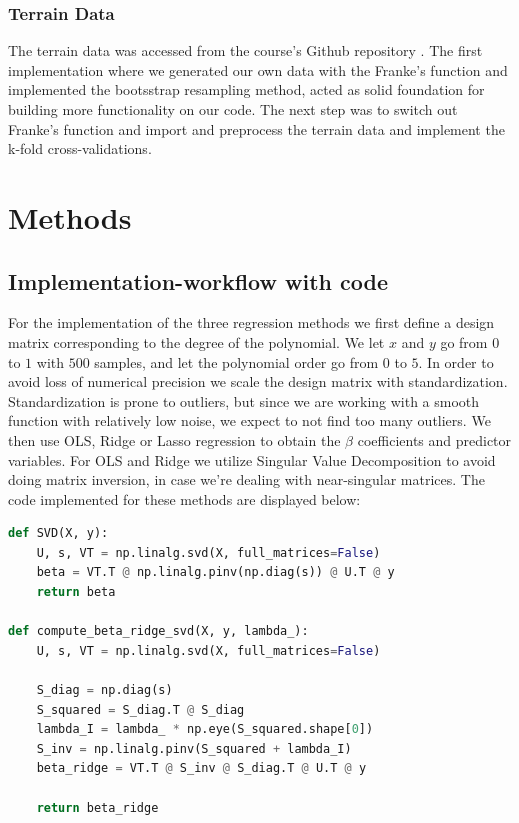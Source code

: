 \documentclass[aps,rmp,reprint,amsmath,amssymb,graphicx,longbibliography]{revtex4-1}
\begin{document}
\subsubsection{Terrain Data}
The terrain data was accessed from the course's Github repository \cite{lectureNotes2024}. The first implementation where we generated our own data with the Franke's function and implemented the bootsstrap resampling method, acted as solid foundation for building more functionality on our code. The next step was to switch out Franke's function and import and preprocess the terrain data and implement the k-fold cross-validations.


\section{Methods}
\subsection{Implementation-workflow with code}
For the implementation of the three regression methods we first define a design matrix corresponding to the degree of the polynomial. We let $x$ and $y$ go from $0$ to $1$ with $500$ samples, and let the polynomial order go from $0$ to $5$. In order to avoid loss of numerical precision we scale the design matrix with standardization. Standardization is prone to outliers, but since we are working with a smooth function with relatively low noise, we expect to not find too many outliers. We then use OLS, Ridge or Lasso regression to obtain the $\beta$ coefficients and predictor variables. For OLS and Ridge we utilize Singular Value Decomposition to avoid doing matrix inversion, in case we're dealing with near-singular matrices. The code implemented for these methods are displayed below:

\begin{lstlisting}[language=Python]
def SVD(X, y):
    U, s, VT = np.linalg.svd(X, full_matrices=False)
    beta = VT.T @ np.linalg.pinv(np.diag(s)) @ U.T @ y
    return beta

def compute_beta_ridge_svd(X, y, lambda_):
    U, s, VT = np.linalg.svd(X, full_matrices=False)

    S_diag = np.diag(s)
    S_squared = S_diag.T @ S_diag
    lambda_I = lambda_ * np.eye(S_squared.shape[0])
    S_inv = np.linalg.pinv(S_squared + lambda_I)
    beta_ridge = VT.T @ S_inv @ S_diag.T @ U.T @ y

    return beta_ridge
\end{lstlisting}
\end{document}
